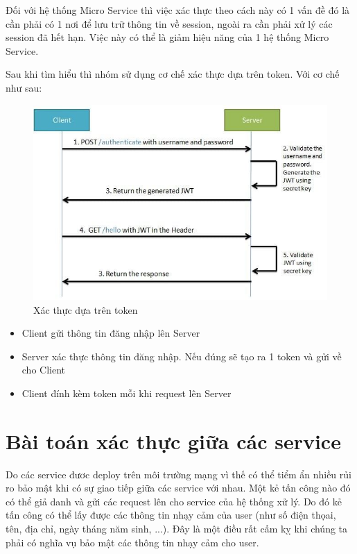 		Đối với hệ thống Micro Service thì việc xác thực theo cách này có 1 vấn đề đó là cần phải có 1 nơi để lưu trữ thông tin về session, ngoài ra cần phải xử lý các session đã hết hạn. Việc này có thể là giảm hiệu năng của 1 hệ thống Micro Service.
		
		Sau khi tìm hiểu thì nhóm sử dụng cơ chế xác thực dựa trên token. Với cơ chế như sau:
		
		\newpage
		
		\begin{figure}[!ht]
			\includegraphics[width=1\textwidth]{Images/authbasedtoken.jpg}
			\centering
			\linebreak
			\caption{Xác thực dựa trên token}
		\end{figure}
		
		\begin{itemize}
                \item Client gửi thông tin đăng nhập lên Server
                \item Server xác thực thông tin đăng nhập. Nếu đúng sẽ tạo ra 1 token và gửi về cho Client
                \item Client đính kèm token mỗi khi request lên Server 
            \end{itemize}
		
		
		\section{Bài toán xác thực giữa các service}
		Do các service đươc deploy trên môi trường mạng vì thế có thể tiểm ẩn nhiều rủi ro bảo mật khi có sự giao tiếp giữa các service với nhau. Một kẻ tấn công nào đó có thể giả danh và gửi các request lên cho service của hệ thống xử lý. Do đó kẻ tấn công có thể lấy được các thông tin nhạy cảm của user (như số điện thọai, tên, địa chỉ, ngày tháng năm sinh, ...). Đây là một điều rất cấm kỵ khi chúng ta phải có nghĩa vụ bảo mật các thông tin nhạy cảm cho user.\\
		
